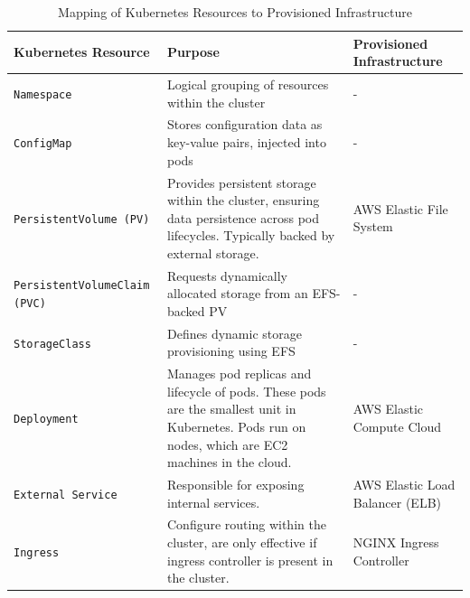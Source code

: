 \begin{table}[h]
    \centering
    \begin{tabular}{|p{5cm}|p{5cm}|p{4cm}|}
        \hline
        \textbf{Kubernetes Resource} & \textbf{Purpose} & \textbf{Provisioned Infrastructure}\\
        \hline
        \texttt{Namespace} & Logical grouping of resources within the cluster & - \\
        \hline
        \texttt{ConfigMap} & Stores configuration data as key-value pairs, injected into pods  & -\\
        \hline 
        \texttt{PersistentVolume (PV)} & Provides persistent storage within the cluster, ensuring data persistence across pod lifecycles. Typically backed by external storage. & AWS Elastic File System \\
        \hline
        \texttt{PersistentVolumeClaim (PVC)} & Requests dynamically allocated storage from an EFS-backed PV  & -\\
        \hline
        \texttt{StorageClass} & Defines dynamic storage provisioning using EFS & -\\
        \hline
        \texttt{Deployment} & Manages pod replicas and lifecycle of pods. These pods are the smallest unit in Kubernetes. Pods run on nodes, which are EC2 machines in the cloud. & AWS Elastic Compute Cloud \\
        \hline
        \texttt{External Service} & Responsible for exposing internal services. & AWS Elastic Load Balancer (ELB) \\
        \hline
        \texttt{Ingress} & Configure routing within the cluster, are only effective if ingress controller is present in the cluster. & NGINX Ingress Controller \\
        \hline
    \end{tabular}
    \caption{Mapping of Kubernetes Resources to Provisioned Infrastructure}
    \label{tab:components}
\end{table}


